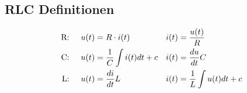 \subsection{RLC Definitionen}

\begin{align*}
    \textrm{R:}\hspace{5mm} & u(t) = R \cdot i(t)             & i(t) &= \frac{u(t)}{R} \\
    \textrm{C:}\hspace{5mm} & u(t) = \frac{1}{C}\int i(t)dt+c & i(t) &= \frac{du}{dt}C \\
    \textrm{L:}\hspace{5mm} & u(t) = \frac{di}{dt}L           & i(t) &= \frac{1}{L}\int u(t)dt+c \\
\end{align*}

